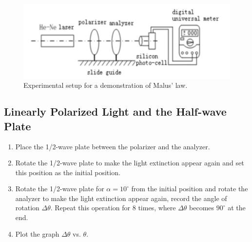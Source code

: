 \documentclass{article}
\begin{document}
\begin{figure}
\centering
\includegraphics[scale=1]{setup.PNG}
\caption{Experimental setup for a demonstration of Malus’ law.}\label{fig.setup}
\end{figure}

\subsection{Linearly Polarized Light and the Half-wave Plate}
\begin{enumerate}
\item Place the 1/2-wave plate between the polarizer and the analyzer. 
\item Rotate the 1/2-wave plate to make the light extinction appear again and set this position as the initial position.
\item Rotate the 1/2-wave plate for $\alpha = 10^\circ$ from the initial position and rotate the analyzer to make the light extinction appear again, record the angle of rotation $\Delta\theta$. Repeat this operation for 8 times, where  $\Delta\theta$ becomes $90^{\circ}$ at the end.
\item Plot the graph $\Delta\theta$ vs. $\theta$.
\end{enumerate}
\end{document}

